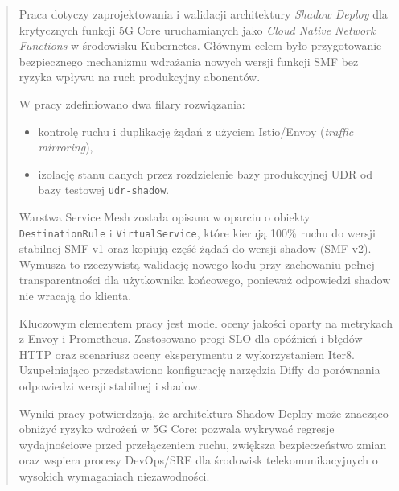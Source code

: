 \begin{abstract}
Praca dotyczy zaprojektowania i walidacji architektury \emph{Shadow Deploy} dla krytycznych funkcji 5G Core uruchamianych jako \emph{Cloud Native Network Functions} w środowisku Kubernetes. Głównym celem było przygotowanie bezpiecznego mechanizmu wdrażania nowych wersji funkcji SMF bez ryzyka wpływu na ruch produkcyjny abonentów.

W pracy zdefiniowano dwa filary rozwiązania:
\begin{itemize}
    \item kontrolę ruchu i duplikację żądań z użyciem Istio/Envoy (\emph{traffic mirroring}),
    \item izolację stanu danych przez rozdzielenie bazy produkcyjnej UDR od bazy testowej \texttt{udr-shadow}.
\end{itemize}

\vspace{2em}

Warstwa Service Mesh została opisana w oparciu o obiekty \texttt{DestinationRule} i \texttt{VirtualService}, które kierują 100\% ruchu do wersji stabilnej SMF v1 oraz kopiują część żądań do wersji shadow (SMF v2). Wymusza to rzeczywistą walidację nowego kodu przy zachowaniu pełnej transparentności dla użytkownika końcowego, ponieważ odpowiedzi shadow nie wracają do klienta.

Kluczowym elementem pracy jest model oceny jakości oparty na metrykach z Envoy i Prometheus. Zastosowano progi SLO dla opóźnień i błędów HTTP oraz scenariusz oceny eksperymentu z wykorzystaniem Iter8. Uzupełniająco przedstawiono konfigurację narzędzia Diffy do porównania odpowiedzi wersji stabilnej i shadow.

Wyniki pracy potwierdzają, że architektura Shadow Deploy może znacząco obniżyć ryzyko wdrożeń w 5G Core: pozwala wykrywać regresje wydajnościowe przed przełączeniem ruchu, zwiększa bezpieczeństwo zmian oraz wspiera procesy DevOps/SRE dla środowisk telekomunikacyjnych o wysokich wymaganiach niezawodności.
\end{abstract}
